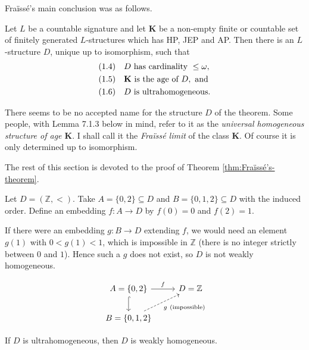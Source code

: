 Fraïssé’s main conclusion was as follows.

\begin{theorem}\label{thm:Fraïssé’s-theorem}
    Let \( L \) be a countable signature and let \( \mathbf{K} \) be a non-empty finite or countable set of finitely generated \( L \)-structures which has HP, JEP and AP. Then there is an \( L \)-structure \( D \), unique up to isomorphism, such that
    \begin{align}
        \text{(1.4)}\quad & D \text{ has cardinality } \leq \omega, \notag          \\
        \text{(1.5)}\quad & \mathbf{K} \text{ is the age of } D, \text{ and} \notag \\
        \text{(1.6)}\quad & D \text{ is ultrahomogeneous}. \notag
    \end{align}
\end{theorem}


There seems to be no accepted name for the structure \( D \) of the theorem. Some people, with Lemma 7.1.3 below in mind, refer to it as the \emph{universal homogeneous structure of age \( \mathbf{K} \)}. I shall call it the \emph{Fraïssé limit} of the class \( \mathbf{K} \). Of course it is only determined up to isomorphism.

The rest of this section is devoted to the proof of Theorem \ref{thm:Fraïssé’s-theorem}.


\begin{example}
    Let \(D=(\mathbb{Z},<)\). Take \(A=\{0,2\}\subseteq D\) and \(B=\{0,1,2\}\subseteq D\) with the induced order.
    Define an embedding \(f:A\to D\) by \(f(0)=0\) and \(f(2)=1\).

    If there were an embedding \(g:B\to D\) extending \(f\), we would need an element \(g(1)\) with
    \(0<g(1)<1\), which is impossible in \(\mathbb{Z}\) (there is no integer strictly between \(0\) and \(1\)).
    Hence such a \(g\) does not exist, so \(D\) is not weakly homogeneous.

    \[
        \begin{tikzcd}[ampersand replacement=\&]
            A=\{0,2\} \arrow[r,"f"] \arrow[d,hook] \& D=\mathbb{Z} \\
            B=\{0,1,2\} \arrow[ur,dashed,"g\ \text{(impossible)}"']
        \end{tikzcd}
    \]
\end{example}

\begin{lemma}
    If $D$ is ultrahomogeneous, then $D$ is weakly homogeneous.
\end{lemma}

